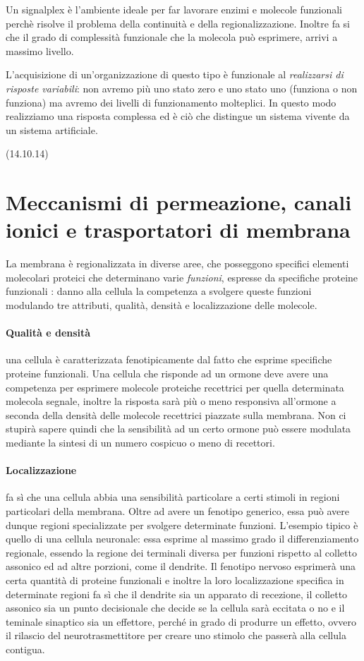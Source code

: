 \documentclass[a4paper,12pt]{article}
\begin{document}
Un signalplex è l'ambiente ideale per far lavorare enzimi e molecole funzionali perchè risolve il problema della continuità e della regionalizzazione. Inoltre fa si che il grado di complessità funzionale che la molecola può esprimere, arrivi a massimo livello.

L'acquisizione di un'organizzazione di questo tipo è funzionale al \emph{realizzarsi di risposte variabili}: non avremo più uno stato zero e uno stato uno (funziona o non funziona) ma avremo dei livelli di funzionamento molteplici. In questo modo realizziamo una risposta complessa ed è ciò che distingue un sistema vivente da un sistema artificiale.

(14.10.14)
\section{Meccanismi di permeazione, canali ionici e trasportatori di membrana}

La membrana è regionalizzata in diverse aree, che posseggono specifici elementi molecolari proteici che determinano varie \emph{funzioni}, espresse da specifiche proteine funzionali : danno alla cellula la competenza a svolgere queste funzioni modulando tre attributi, qualità, densità e localizzazione delle molecole.

\paragraph{Qualità e densità}
una cellula è caratterizzata fenotipicamente dal fatto che esprime specifiche proteine funzionali.
Una cellula che risponde ad un ormone deve avere una competenza per esprimere molecole proteiche recettrici per quella determinata molecola segnale, inoltre la risposta sarà più o meno responsiva all’ormone a seconda della densità delle molecole recettrici piazzate sulla membrana. Non ci stupirà sapere quindi che la sensibilità ad un certo ormone può essere modulata mediante la sintesi di un numero cospicuo o meno di recettori. 


\paragraph{Localizzazione} fa sì che una cellula abbia una sensibilità particolare a certi stimoli in regioni particolari della membrana. Oltre ad avere un fenotipo generico, essa può avere dunque regioni specializzate per svolgere determinate funzioni. L'esempio tipico è quello di una cellula neuronale: essa esprime al massimo grado il differenziamento regionale, essendo la regione dei terminali diversa per funzioni rispetto al colletto assonico ed ad altre porzioni, come il dendrite.
Il fenotipo nervoso esprimerà una certa quantità di proteine funzionali e inoltre la loro localizzazione specifica in determinate regioni fa sì che il dendrite sia un apparato di recezione, il colletto assonico sia un punto decisionale che decide se la cellula sarà eccitata o no e il teminale sinaptico sia un effettore, perché in grado di produrre un effetto, ovvero il rilascio del neurotrasmettitore per creare uno stimolo che passerà alla cellula contigua.
\end{document}
